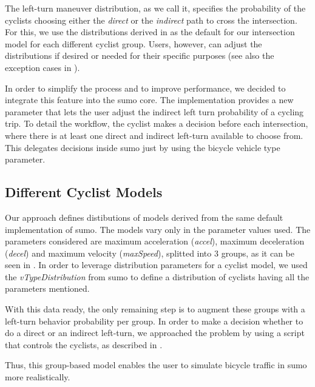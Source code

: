 The left-turn maneuver distribution, as we call it, specifies the probability of the cyclists choosing either the \textit{direct} or the \textit{indirect} path to cross the intersection.
For this, we use the distributions derived in  as the default for our intersection model for each different cyclist group.
Users, however, can adjust the distributions if desired or needed for their specific purposes (see also the exception cases in ).

In order to simplify the process and to improve performance, we decided to integrate this feature into the \ac{sumo} core.
The implementation provides a new parameter that lets the user adjust the indirect left turn probability of a cycling trip.
To detail the workflow, the cyclist makes a decision before each intersection, where there is at least one direct and indirect left-turn available to choose from.
This delegates decisions inside \ac{sumo} just by using the bicycle vehicle type parameter.

\subsection{Different Cyclist Models}
\label{subsec:different_cyclist_models}

Our approach defines distibutions of models derived from the same default implementation of \ac{sumo}.
The models vary only in the parameter values used.
The parameters considered are maximum acceleration (\textit{accel}), maximum deceleration (\textit{decel}) and maximum velocity (\textit{maxSpeed}), splitted into \num{3} groups, as it can be seen in .
In order to leverage distribution parameters for a cyclist model, we used the \textit{vTypeDistribution} from \ac{sumo} to define a distribution of cyclists having all the parameters mentioned.

With this data ready, the only remaining step is to augment these groups with a left-turn behavior probability per group.
In order to make a decision whether to do a direct or an indirect left-turn, we approached the problem by using a script that controls the cyclists, as described in .

Thus, this group-based model enables the user to simulate bicycle traffic in \ac{sumo} more realistically.


